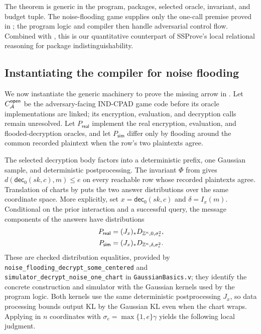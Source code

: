 The theorem is generic in the program, packages, selected oracle, invariant, and budget tuple.
The noise-flooding game supplies only the one-call premise proved in
; the program logic and compiler then handle adversarial
control flow.
Combined with , this is our quantitative counterpart of SSProve's local relational reasoning for package indistinguishability.

\subsection{Instantiating the compiler for noise flooding}
\label{sec:closing-hop}

We now instantiate the generic machinery to prove the missing arrow in
.
Let \(C_{\mathcal{A}}^{\mathsf{open}}\) be the adversary-facing IND-CPAD game code
before its oracle implementations are linked; its encryption, evaluation, and
decryption calls remain unresolved.
Let \(P_{\mathsf{real}}\) implement the real encryption, evaluation, and
flooded-decryption oracles, and let \(P_{\mathsf{sim}}\) differ only by
flooding around the common recorded plaintext when the row's two plaintexts
agree.

The selected decryption body factors into a deterministic prefix, one Gaussian
sample, and deterministic postprocessing.
The invariant \(\Phi\) from  gives
\(d(\mathsf{dec}_0(sk,c),m)\leq e\) on every reachable row whose recorded
plaintexts agree.
Translation of charts by  puts the two answer distributions
over the same coordinate space.
More explicitly, set \(x=\mathsf{dec}_0(sk,c)\) and
\(\delta=I_x(m)\).  Conditional on the prior interaction and a successful
query, the message components of the answers have distributions
\[
\begin{aligned}
 P_{\mathsf{real}}&=(J_x)_*D_{\mathbb{Z}^n,0,\sigma_e^2},\\
 P_{\mathsf{sim}}&=(J_x)_*D_{\mathbb{Z}^n,\delta,\sigma_e^2}.
\end{aligned}
\]
These are checked distribution equalities, provided by
\nolinkurl{noise_flooding_decrypt_some_centered} and
\nolinkurl{simulator_decrypt_noise_one_chart} in
\texttt{GaussianBasics.v}; they identify the concrete construction and
simulator with the Gaussian kernels used by the program logic.
Both kernels use the same deterministic postprocessing \(J_x\), so data
processing bounds output KL by the Gaussian KL even when the chart wraps.
Applying  in \(n\) coordinates with
\(\sigma_e=\max\{1,e\}\gamma\) yields the following local judgment.

